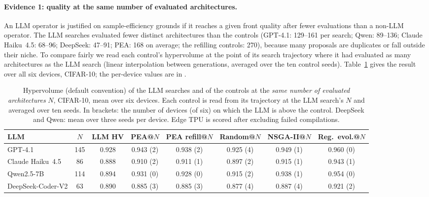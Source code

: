 \paragraph{Evidence 1: quality at the same number of evaluated architectures.} An LLM operator is justified on sample-efficiency grounds if it reaches a given front quality after fewer evaluations than a non-LLM operator. The LLM searches evaluated fewer distinct architectures than the controls (GPT-4.1: 129--161 per search; Qwen: 89--136; Claude Haiku~4.5: 68--96; DeepSeek: 47--91; PEA: 168 on average; the refilling controls: 270), because many proposals are duplicates or fall outside their niche. To compare fairly we read each control's hypervolume at the point of its search trajectory where it had evaluated as many architectures as the LLM search (linear interpolation between generations, averaged over the ten control seeds). Table~\ref{tab:matched} gives the result over all six devices, CIFAR-10; the per-device values are in .

\begin{table}[h]\centering\footnotesize
\caption{Hypervolume (default convention) of the LLM searches and of the controls at the \emph{same number of evaluated architectures} $N$, CIFAR-10, mean over six devices. Each control is read from its trajectory at the LLM search's $N$ and averaged over ten seeds. In brackets: the number of devices (of six) on which the LLM is above the control. DeepSeek and Qwen: mean over three seeds per device. Edge TPU is scored after excluding failed compilations.}\label{tab:matched}
\setlength{\tabcolsep}{3.5pt}
\begin{tabular}{lcc|ccccc}
\toprule
LLM & $N$ & LLM HV & PEA@$N$ & PEA refill@$N$ & Random@$N$ & NSGA-II@$N$ & Reg.\ evol.@$N$ \\
\midrule
GPT-4.1          & 145 & 0.928 & 0.943 (2) & 0.938 (2) & 0.925 (4) & 0.949 (1) & 0.960 (0) \\
Claude Haiku~4.5 & 86  & 0.888 & 0.910 (2) & 0.911 (1) & 0.897 (2) & 0.915 (1) & 0.943 (1) \\
Qwen2.5-7B       & 114 & 0.894 & 0.931 (0) & 0.928 (0) & 0.915 (2) & 0.938 (1) & 0.954 (0) \\
DeepSeek-Coder-V2 & 63 & 0.890 & 0.885 (3) & 0.885 (3) & 0.877 (4) & 0.887 (4) & 0.921 (2) \\
\bottomrule
\end{tabular}
\end{table}

